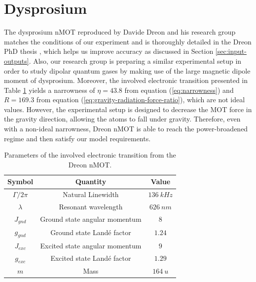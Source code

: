 %
\section{Dysprosium}
\label{sec:dysprosium}
%

The dysprosium nMOT \cite{dreon2017optical} reproduced by Davide Dreon and his research group matches the conditions of our experiment and is thoroughly detailed in the Dreon PhD thesis \cite{dreon2017designing}, which helps us improve accuracy as discussed in Section \ref{sec:input-outputs}. Also, our research group is preparing a similar experimental setup in order to study dipolar quantum gases by making use of the large magnetic dipole moment of dysprosium. Moreover, the involved electronic transition presented in Table \ref{tab:electronic-transition-Dy-Dreon} yields a narrowness of $ \eta =  43.8 $ from equation (\ref{eq:narrowness}) and $ R = 169.3 $ from equation (\ref{eq:gravity-radiation-force-ratio}), which are not ideal values. However, the experimental setup is designed to decrease the MOT force in the gravity direction, allowing the atoms to fall under gravity. Therefore, even with a non-ideal narrowness, Dreon nMOT is able to reach the power-broadened regime and then satisfy our model requirements.

\begin{table}[ht!]
    \centering
    \caption{Parameters of the involved electronic transition from the Dreon nMOT.}
    \begin{tabular}{|c|c|c|}
        \hline
        \textbf{Symbol} & \textbf{Quantity} & \textbf{Value} \\ \hline
        $ \Gamma / 2\pi $ & Natural Linewidth & $ 136\ kHz $ \\
        $ \lambda $ & Resonant wavelength & $ 626\ nm $ \\
        $ J_{gnd} $ & Ground state angular momentum & $ 8 $ \\
        $ g_{gnd} $ & Ground state Landé factor & $ 1.24 $ \\
        $ J_{exc} $ & Excited state angular momentum & $ 9 $ \\
        $ g_{exc} $ & Excited state Landé factor & $ 1.29 $ \\
        $ m $ & Mass & $ 164\ u $ \\
        \hline
    \end{tabular}
    \vspace{10px}
    \label{tab:electronic-transition-Dy-Dreon}
\end{table}

